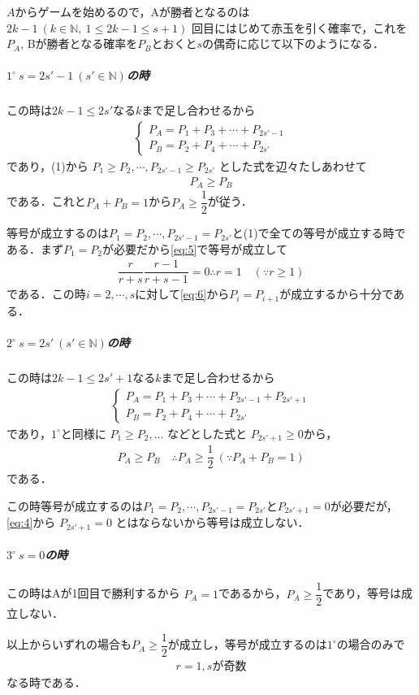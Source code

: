 \documentclass[../../main.tex]{subfiles}
\begin{document}
$A$からゲームを始めるので，Aが勝者となるのは $2k-1 \ (k \in \mathbb{N}, \ 1 \le 2k-1 \le s+1)$ 回目にはじめて赤玉を引く確率で，これを$P_A$, Bが勝者となる確率を$P_B$とおくと$s$の偶奇に応じて以下のようになる．

\subparagraph{$1^\circ \ s=2s'-1 \ (s' \in \mathbb{N})$の時}

この時は$2k-1 \le 2s'$なる$k$まで足し合わせるから
\begin{align}
  \begin{cases}
    P_A = P_1 + P_3 + \cdots + P_{2s'-1} \\
    P_B = P_2 + P_4 + \cdots + P_{2s'}
  \end{cases}
\end{align}
であり，(1)から $P_1 \ge P_2, \cdots, P_{2s'-1} \ge P_{2s'}$ とした式を辺々たしあわせて
\begin{align}
  P_A \ge P_B
\end{align}
である．これと$P_A + P_B = 1$から$P_A \ge \dfrac{1}{2}$が従う．

等号が成立するのは$P_1 = P_2, \cdots, P_{2s'-1} = P_{2s'}$と(1)で全ての等号が成立する時である．まず$P_1=P_2$が必要だから\cref{eq:5}で等号が成立して
\begin{align}
  \dfrac{r}{r+s}\dfrac{r-1}{r+s-1} = 0
  \therefore
  r = 1 \quad (\because r \ge 1)
\end{align}
である．この時$i=2,\cdots,s$に対して\cref{eq:6}から$P_i=P_{i+1}$が成立するから十分である．

\subparagraph{$2^\circ \ s=2s' \ (s' \in \mathbb{N})$の時}

この時は$2k-1 \le 2s'+1$なる$k$まで足し合わせるから
\begin{align}
  \begin{cases}
    P_A = P_1 + P_3 + \cdots + P_{2s'-1} + P_{2s'+1} \\
    P_B = P_2 + P_4 + \cdots + P_{2s'}
  \end{cases}
\end{align}
であり，$1^{\circ}$と同様に $P_1 \ge P_2, \dots$ などとした式と $P_{2s'+1} \ge 0$から，
\begin{align}
  P_A \ge P_B \quad \therefore P_A \ge \dfrac{1}{2} \ (\because P_A + P_B = 1)
\end{align}
である．

この時等号が成立するのは$P_1 = P_2, \cdots, P_{2s'-1} = P_{2s'}$と$P_{2s'+1}=0$が必要だが，\cref{eq:4}から $P_{2s'+1}=0$ とはならないから等号は成立しない．

\subparagraph{$3^\circ \ s=0$の時}

この時はAが1回目で勝利するから $P_A = 1$であるから，$P_A \ge \dfrac{1}{2}$であり，等号は成立しない．
\casesend

以上からいずれの場合も$P_A \ge \dfrac{1}{2}$が成立し，等号が成立するのは$1^{\circ}$の場合のみで
\begin{align}
  r=1, s \text{が奇数}
\end{align}
なる時である．
\end{document}
